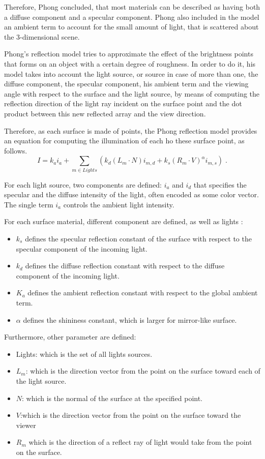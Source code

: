 \documentclass[12pt,a4paper]{extarticle}
\newcommand{\linespace}{\vspace{8pt}}
\begin{document}
Therefore, Phong concluded, that most materials can be described as having both a diffuse component and a specular component. Phong also included in the model an ambient term to account for the small amount of light, that is scattered about the 3-dimensional scene.
\linespace

Phong's reflection model tries to approximate the effect of the brightness points that forms on an object with a certain degree of roughness. In order to do it, his model takes into account the light source, or source in case of more than one, the diffuse component, the specular component, his ambient term and the viewing angle with respect to the surface and the light source, by means of computing the reflection direction of the light ray incident on the surface point and the dot product between this new reflected array and the view direction.

Therefore, as each surface is made of points, the Phong reflection model provides an equation for computing the illumination of each ho these surface point, as follows.
\[
I = k_{a} i_{a} + \sum_{m \in Lights} (k_{d}(L_{m} \cdot N)i_{m,d} +k_{s}(R_{m} \cdot V)^{\alpha}i_{m,s}) \;.
\]

For each light source, two components are defined: $i_{a}$ and $i_{d}$ that specifies the specular and the diffuse intensity of the light, often encoded as some color vector. The single term $i_{a}$ controls the ambient light intensity.

For each surface material, different component  are defined, as well as lights :
\begin{itemize}
\item $k_{s}$ defines the specular reflection constant of the surface with respect to the specular component of the incoming light.

\item $k_{d}$ defines the diffuse reflection constant with respect to the diffuse component of the incoming light.

\item $K_{a}$ defines the ambient reflection constant with respect to the global ambient term.
\item$\alpha$ defines the shininess constant, which is larger for mirror-like surface.
\end{itemize}

Furthermore, other parameter are defined:
\begin{itemize}
\item Lights: which is the set of all lights sources.
\item $L_{m}$: which is the direction vector from the point on the surface toward each of the light source.
\item $N$: which is the normal of the surface at the specified point.
\item $V$:which is the direction vector from the point on the surface toward the viewer
\item $R_{m}$ which is the direction of a reflect ray of light would take from the point on the surface.
\end{itemize}
\end{document}

